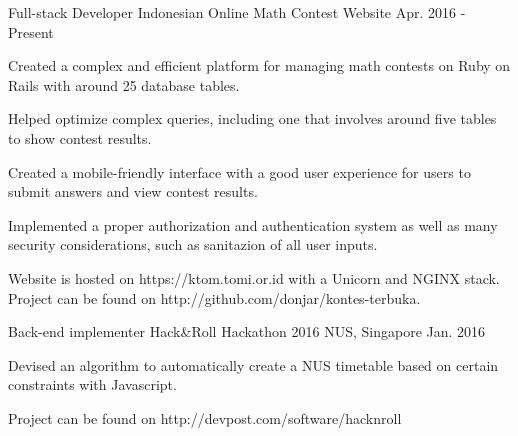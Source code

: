 

\begin{cventries}

	\cventry
	{Full-stack Developer} %
	{Indonesian Online Math Contest Website} %
	{} %
	{Apr. 2016 - Present} %
	{
		\begin{cvitems} %
		\item {Created a complex and efficient platform for managing math contests on Ruby on Rails with around 25 database tables.}
		\item {Helped optimize complex queries, including one that involves around five tables to show contest results.}
		\item {Created a mobile-friendly interface with a good user experience for users to submit answers and view contest results.}
		\item {Implemented a proper authorization and authentication system as well as many security considerations, such as sanitazion of all user inputs.}
		\item {Website is hosted on https://ktom.tomi.or.id with a Unicorn and NGINX stack. Project can be found on http://github.com/donjar/kontes-terbuka.}
		\end{cvitems}
	}

	\cventry
	{Back-end implementer} %
	{Hack\&Roll Hackathon 2016} %
	{NUS, Singapore} %
	{Jan. 2016} %
	{
		\begin{cvitems} %
		\item {Devised an algorithm to automatically create a NUS timetable based on certain constraints with Javascript.}
		\item {Project can be found on http://devpost.com/software/hacknroll}
		\end{cvitems}
	}


\end{cventries}
